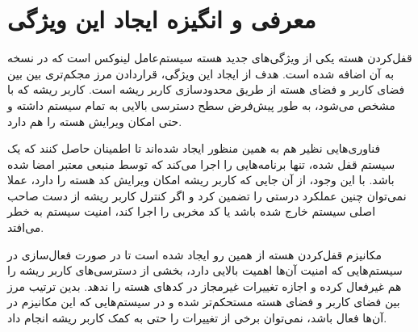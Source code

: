 \vspace{-0.4cm}
\section*{معرفی و  انگیزه ایجاد این ویژگی}
\vspace{-0.15cm}
قفل‌کردن هسته
یکی از ویژگی‌های جدید هسته سیستم‌عامل لینوکس
است که در نسخه  به آن اضافه شده است.
هدف از ایجاد این ویژگی، قراردادن مرز مجکم‌تری بین بین فضای کاربر
و فضای هسته
از طریق محدودسازی کاربر ریشه
است.
\cite{zdnet}
 کاربر ریشه که با  مشخص می‌شود، به طور پیش‌فرض سطح دسترسی بالایی به تمام سیستم داشته و حتی امکان ویرایش هسته را هم دارد.
\cite{kenreln}

فناوری‌هایی نظیر  هم به همین منظور ایجاد شده‌اند تا اطمینان حاصل کنند که یک سیستم قفل شده، تنها برنامه‌هایی را اجرا می‌کند که توسط منبعی معتبر امضا شده باشد. با این وجود، از آن جایی که کاربر ریشه امکان ویرایش کد هسته را دارد، عملا نمی‌توان چنین عملکرد درستی را تضمین کرد و اگر کنترل کاربر ریشه از دست صاحب اصلی سیستم خارج شده باشد یا کد مخربی را اجرا کند، امنیت سیستم به خطر می‌افتد.
\cite{LWN}

مکانیزم قفل‌کردن هسته از همین رو ایجاد شده است تا در صورت فعال‌سازی در سیستم‌هایی که امنیت آن‌ها اهمیت بالایی دارد، بخشی از دسترسی‌های کاربر ریشه را هم غیرفعال کرده و اجازه تغییرات غیرمجاز در کدهای هسته را ندهد. بدین ترتیب مرز بین فضای کاربر و فضای هسته مستحکم‌تر شده و در سیستم‌هایی که این مکانیزم در آن‌ها فعال باشد، نمی‌توان برخی از تغییرات را حتی به کمک کاربر ریشه انجام داد.
\cite{LWN}
